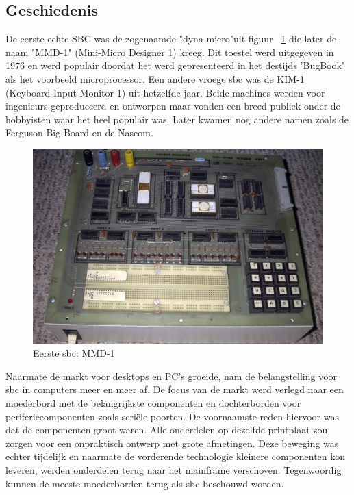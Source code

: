 	\subsection{Geschiedenis}
	De eerste echte SBC was de zogenaamde "dyna-micro"\space uit figuur ~\ref{fig:eersteSBC} die later de naam "MMD-1" (Mini-Micro Designer 1) kreeg. Dit toestel werd uitgegeven in 1976 en werd populair doordat het werd gepresenteerd in het destijds 'BugBook' als het voorbeeld microprocessor. Een andere vroege \gls{sbc} was de KIM-1 (Keyboard Input Monitor 1) uit hetzelfde jaar. Beide machines werden voor ingenieurs geproduceerd en ontworpen maar vonden een breed publiek onder de hobbyisten waar het heel populair was. Later kwamen nog andere namen zoals de Ferguson Big Board en de Nascom.

	\begin{figure}
		\centering
		\includegraphics[width=120mm]{afbeeldingen/Early_1976_MMD1_Prototype_most_chips_removed.PNG}
		\caption{Eerste \gls{sbc}: MMD-1 \cite{bron:fotoeerstesbc}}
		\label{fig:eersteSBC}
	\end{figure}
	
	Naarmate de markt voor desktops en PC's groeide, nam de belangstelling voor \gls{sbc} in computers meer en meer af. De focus van de markt werd verlegd naar een moederbord met de belangrijkste componenten en dochterborden voor periferiecomponenten zoals seriële poorten. De voornaamste reden hiervoor was dat de componenten groot waren. Alle onderdelen op dezelfde printplaat zou zorgen voor een onpraktisch ontwerp met grote afmetingen. Deze beweging was echter tijdelijk en naarmate de vorderende technologie kleinere componenten kon leveren, werden onderdelen terug naar het mainframe verschoven. Tegenwoordig kunnen de meeste moederborden terug als \gls{sbc} beschouwd worden. 

